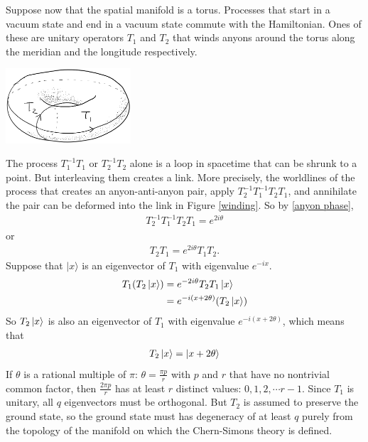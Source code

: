\documentclass[aps,nofootinbib]{revtex4}
\begin{document}
Suppose now that the spatial manifold is a torus. Processes that start in a vacuum state and end in a vacuum state commute with the Hamiltonian. Ones of these are unitary operators $T_1$ and $T_2$ that winds anyons around the torus along the meridian and the longitude respectively.
\begin{center}
\includegraphics[width=0.35\textwidth]{torus.png}
\end{center}
The process $T_1^{-1}T_1$ or $T_2^{-1}T_2$ alone is a loop in spacetime that can be shrunk to a point. But interleaving them creates a link. More precisely, the worldlines of the process that creates an anyon-anti-anyon pair, apply $T_2^{-1} T_1^{-1} T_2 T_1$, and annihilate the pair can be deformed into the link in Figure \ref{winding}. So by \eqref{anyon phase},
\begin{align*}
T_2^{-1} T_1^{-1} T_2 T_1 = e^{2i\theta}
\end{align*}
or
\begin{align}
T_2 T_1 = e^{2i\theta} T_1 T_2.
\end{align}
Suppose that $|x \rangle$ is an eigenvector of $T_1$ with eigenvalue $e^{-ix}$.
\begin{align*}
T_1 (T_2 \ket{x}) &= e^{-2i\theta} T_2 T_1 \ket{x} \\
	&= e^{-i (x + 2\theta)} (T_2 \ket{x})
\end{align*}
So $T_2 \ket{x}$ is also an eigenvector of $T_1$ with eigenvalue $e^{-i (x + 2\theta)}$, which means that
\begin{align}
T_2 \ket{x} = \ket{x+2\theta}
\end{align}
If $\theta$ is a rational multiple of $\pi$: $\theta = \frac{\pi p}{r}$ with $p$ and $r$ that have no nontrivial common factor, then $\frac{2\pi p}{r}$ has at least $r$ distinct values: $0,1,2,\cdots r-1$. Since $T_1$ is unitary, all $q$ eigenvectors must be orthogonal. But $T_2$ is assumed to preserve the ground state, so the ground state must has degeneracy of at least $q$ purely from the topology of the manifold on which the Chern-Simons theory is defined.
\end{document}
